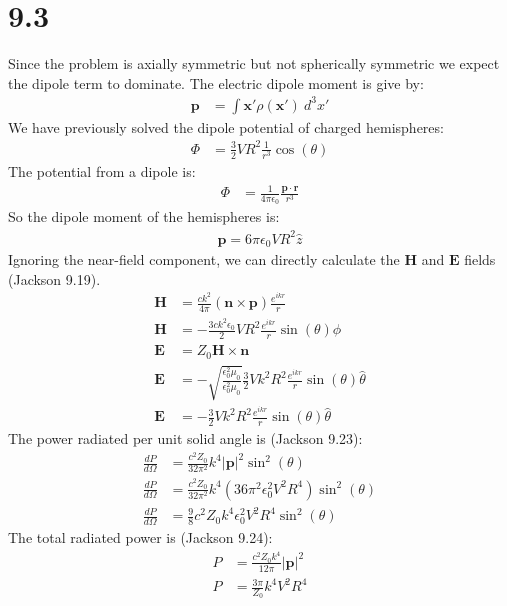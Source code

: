 \documentclass[a4paper,11pt]{article}
\numberwithin{equation}{section}
\newcommand{\bv}[1]{\mathbf{#1}}
\newcommand{\ez}{\epsilon_0}
\newcommand{\lrp}[1]{\left({#1}\right)}
\begin{document}
\section*{9.3}
Since the problem is axially symmetric but not spherically symmetric we expect the dipole term to dominate.
The electric dipole moment is give by:
\begin{align}
 \bv{p} &= \int \bv{x}'\rho(\bv{x}')\ d^3x'
\end{align}
We have previously solved the dipole potential of charged hemispheres:
\begin{align}
 \Phi &= \frac{3}{2}VR^2\frac{1}{r^3}\cos{(\theta)}
\end{align}
The potential from a dipole is:
\begin{align}
 \Phi &= \frac{1}{4\pi\ez}\frac{\bv{p}\cdot \bv{r}}{r^3}
\end{align}
So the dipole moment of the hemispheres is:
\begin{align}
 \bv{p} = 6\pi\ez VR^2\hat{z}
\end{align}
Ignoring the near-field component, we can directly calculate the $\bv{H}$ and $\bv{E}$ fields (Jackson 9.19).
\begin{align}
 \bv{H} &= \frac{ck^2}{4\pi}(\bv{n} \times \bv{p})\frac{e^{ikr}}{r}\\
 \bv{H} &= -\frac{3ck^2\ez}{2}VR^2\frac{e^{ikr}}{r}\sin{(\theta)}\hat{\phi}\\
 \bv{E} &= Z_0\bv{H} \times \bv{n}\\
 \bv{E} &= -\sqrt{\frac{\ez^2\mu_0}{\ez^2\mu_0}}\frac{3}{2}Vk^2R^2\frac{e^{ikr}}{r}\sin{(\theta)}\hat{\theta}\\
 \bv{E} &= -\frac{3}{2}Vk^2R^2\frac{e^{ikr}}{r}\sin{(\theta)}\hat{\theta}
\end{align}
The power radiated per unit solid angle is (Jackson 9.23):
\begin{align}
 \frac{dP}{d\Omega} &= \frac{c^2Z_0}{32\pi^2}k^4|\bv{p}|^2\sin^2{(\theta)}\\
 \frac{dP}{d\Omega} &= \frac{c^2Z_0}{32\pi^2}k^4\lrp{36\pi^2\ez^2V^2R^4}\sin^2{(\theta)}\\
 \frac{dP}{d\Omega} &= \frac{9}{8}c^2Z_0k^4\ez^2V^2R^4\sin^2{(\theta)}
\end{align}
The total radiated power is (Jackson 9.24):
\begin{align}
 P &= \frac{c^2Z_0k^4}{12\pi}|\bv{p}|^2\\
 P &= \frac{3\pi}{Z_0}k^4V^2R^4
\end{align}
\end{document}
